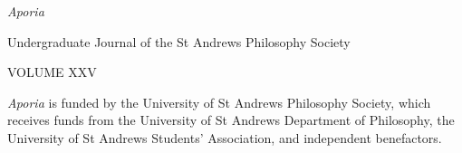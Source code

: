 \begin{center}
    \vspace*{7cm}
    
    {\huge\textit{Aporia}}

        \vspace{3cm}
    \normalsize
    Undergraduate Journal of the St Andrews Philosophy Society

    \vspace{1cm}
    VOLUME XXV
\end{center}

\vfill 

\noindent \textit{Aporia} is funded by the University of St Andrews Philosophy
Society, which receives funds from the University of St Andrews
Department of Philosophy, the University of St Andrews Students’
Association, and independent benefactors.
